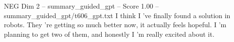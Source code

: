 \begin{textsample}{NEG Dim 2 – summary\_guided\_gpt – Score 1.00 – summary\_guided\_gpt/t606\_gpt.txt}  \label{ex:f2_neg_040}
I think I ’ve finally found a solution in robots.
They ’re getting so much better now, it actually feels hopeful.
I ’m planning to get two of them, and honestly I ’m really excited about it.

\end{textsample}
